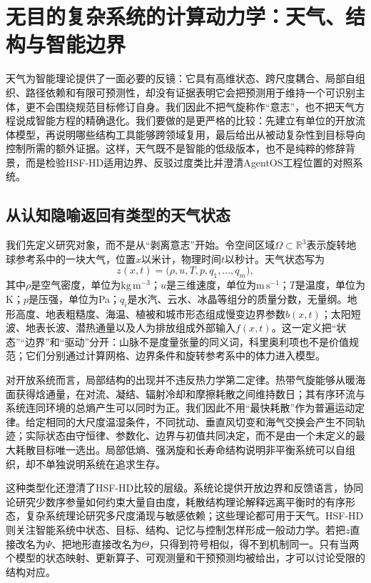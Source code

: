 \chapter{无目的复杂系统的计算动力学：天气、结构与智能边界}
\label{chp:degeneration_limit_weather_system}

天气为智能理论提供了一面必要的反镜：它具有高维状态、跨尺度耦合、局部自组织、路径依赖和有限可预测性，却没有证据表明它会把预测用于维持一个可识别主体，更不会围绕规范目标修订自身。我们因此不把气旋称作“意志”，也不把天气方程说成智能方程的精确退化。我们要做的是更严格的比较：先建立有单位的开放流体模型，再说明哪些结构工具能够跨领域复用，最后给出从被动复杂性到目标导向控制所需的额外证据。这样，天气既不是智能的低级版本，也不是纯粹的修辞背景，而是检验HSF-HD适用边界、反驳过度类比并澄清AgentOS工程位置的对照系统。

\section{从认知隐喻返回有类型的天气状态}
\label{sec:topological_degeneration}

我们先定义研究对象，而不是从“剥离意志”开始。令空间区域$\Omega\subset\mathbb{R}^3$表示旋转地球参考系中的一块大气，位置$x$以米计，物理时间$t$以秒计。天气状态写为
\begin{equation}
    z(x,t)=\bigl(\rho,u,T,p,q_1,\ldots,q_m\bigr),
\end{equation}
其中$\rho$是空气密度，单位为$\mathrm{kg\,m^{-3}}$；$u$是三维速度，单位为$\mathrm{m\,s^{-1}}$；$T$是温度，单位为K；$p$是压强，单位为Pa；$q_i$是水汽、云水、冰晶等组分的质量分数，无量纲。地形高度、地表粗糙度、海温、植被和城市形态组成慢变边界参数$b(x,t)$；太阳短波、地表长波、潜热通量以及人为排放组成外部输入$f(x,t)$。这一定义把“状态”“边界”和“驱动”分开：山脉不是度量张量的同义词，科里奥利项也不是价值规范；它们分别通过计算网格、边界条件和旋转参考系中的体力进入模型。

对开放系统而言，局部结构的出现并不违反热力学第二定律。热带气旋能够从暖海面获得焓通量，在对流、凝结、辐射冷却和摩擦耗散之间维持数日；其有序环流与系统连同环境的总熵产生可以同时为正。我们因此不用“最快耗散”作为普遍运动定律。给定相同的大尺度温湿条件，不同扰动、垂直风切变和海气交换会产生不同轨迹；实际状态由守恒律、参数化、边界与初值共同决定，而不是由一个未定义的最大耗散目标唯一选出。局部低熵、强涡旋和长寿命结构说明非平衡系统可以自组织，却不单独说明系统在追求生存。

这种类型化还澄清了HSF-HD比较的层级。系统论提供开放边界和反馈语言，协同论研究少数序参量如何约束大量自由度，耗散结构理论解释远离平衡时的有序形态，复杂系统理论研究多尺度涌现与敏感依赖；这些理论都可用于天气。HSF-HD则关注智能系统中状态、目标、结构、记忆与控制怎样形成一般动力学。若把$z$直接改名为$\Psi$、把地形直接改名为$\Theta$，只得到符号相似，得不到机制同一。只有当两个模型的状态映射、更新算子、可观测量和干预预测均被给出，才可以讨论受限的结构对应。

